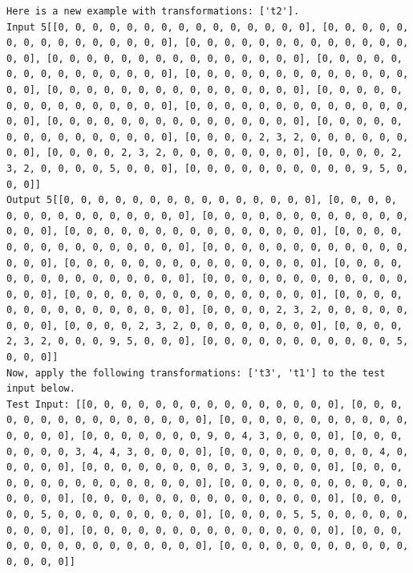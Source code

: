 \begin{lstlisting}
Here is a new example with transformations: ['t2'].
Input 5[[0, 0, 0, 0, 0, 0, 0, 0, 0, 0, 0, 0, 0, 0, 0], [0, 0, 0, 0, 0, 0, 0, 0, 0, 0, 0, 0, 0, 0, 0], [0, 0, 0, 0, 0, 0, 0, 0, 0, 0, 0, 0, 0, 0, 0], [0, 0, 0, 0, 0, 0, 0, 0, 0, 0, 0, 0, 0, 0, 0], [0, 0, 0, 0, 0, 0, 0, 0, 0, 0, 0, 0, 0, 0, 0], [0, 0, 0, 0, 0, 0, 0, 0, 0, 0, 0, 0, 0, 0, 0], [0, 0, 0, 0, 0, 0, 0, 0, 0, 0, 0, 0, 0, 0, 0], [0, 0, 0, 0, 0, 0, 0, 0, 0, 0, 0, 0, 0, 0, 0], [0, 0, 0, 0, 0, 0, 0, 0, 0, 0, 0, 0, 0, 0, 0], [0, 0, 0, 0, 0, 0, 0, 0, 0, 0, 0, 0, 0, 0, 0], [0, 0, 0, 0, 0, 0, 0, 0, 0, 0, 0, 0, 0, 0, 0], [0, 0, 0, 0, 2, 3, 2, 0, 0, 0, 0, 0, 0, 0, 0], [0, 0, 0, 0, 2, 3, 2, 0, 0, 0, 0, 0, 0, 0, 0], [0, 0, 0, 0, 2, 3, 2, 0, 0, 0, 0, 5, 0, 0, 0], [0, 0, 0, 0, 0, 0, 0, 0, 0, 0, 9, 5, 0, 0, 0]]
Output 5[[0, 0, 0, 0, 0, 0, 0, 0, 0, 0, 0, 0, 0, 0, 0], [0, 0, 0, 0, 0, 0, 0, 0, 0, 0, 0, 0, 0, 0, 0], [0, 0, 0, 0, 0, 0, 0, 0, 0, 0, 0, 0, 0, 0, 0], [0, 0, 0, 0, 0, 0, 0, 0, 0, 0, 0, 0, 0, 0, 0], [0, 0, 0, 0, 0, 0, 0, 0, 0, 0, 0, 0, 0, 0, 0], [0, 0, 0, 0, 0, 0, 0, 0, 0, 0, 0, 0, 0, 0, 0], [0, 0, 0, 0, 0, 0, 0, 0, 0, 0, 0, 0, 0, 0, 0], [0, 0, 0, 0, 0, 0, 0, 0, 0, 0, 0, 0, 0, 0, 0], [0, 0, 0, 0, 0, 0, 0, 0, 0, 0, 0, 0, 0, 0, 0], [0, 0, 0, 0, 0, 0, 0, 0, 0, 0, 0, 0, 0, 0, 0], [0, 0, 0, 0, 0, 0, 0, 0, 0, 0, 0, 0, 0, 0, 0], [0, 0, 0, 0, 2, 3, 2, 0, 0, 0, 0, 0, 0, 0, 0], [0, 0, 0, 0, 2, 3, 2, 0, 0, 0, 0, 0, 0, 0, 0], [0, 0, 0, 0, 2, 3, 2, 0, 0, 0, 9, 5, 0, 0, 0], [0, 0, 0, 0, 0, 0, 0, 0, 0, 0, 0, 5, 0, 0, 0]]
Now, apply the following transformations: ['t3', 't1'] to the test input below.
Test Input: [[0, 0, 0, 0, 0, 0, 0, 0, 0, 0, 0, 0, 0, 0, 0], [0, 0, 0, 0, 0, 0, 0, 0, 0, 0, 0, 0, 0, 0, 0], [0, 0, 0, 0, 0, 0, 0, 0, 0, 0, 0, 0, 0, 0, 0], [0, 0, 0, 0, 0, 0, 0, 9, 0, 4, 3, 0, 0, 0, 0], [0, 0, 0, 0, 0, 0, 0, 3, 4, 4, 3, 0, 0, 0, 0], [0, 0, 0, 0, 0, 0, 0, 0, 0, 4, 0, 0, 0, 0, 0], [0, 0, 0, 0, 0, 0, 0, 0, 0, 3, 9, 0, 0, 0, 0], [0, 0, 0, 0, 0, 0, 0, 0, 0, 0, 0, 0, 0, 0, 0], [0, 0, 0, 0, 0, 0, 0, 0, 0, 0, 0, 0, 0, 0, 0], [0, 0, 0, 0, 0, 0, 0, 0, 0, 0, 0, 0, 0, 0, 0], [0, 0, 0, 0, 0, 5, 0, 0, 0, 0, 0, 0, 0, 0, 0], [0, 0, 0, 0, 5, 5, 0, 0, 0, 0, 0, 0, 0, 0, 0], [0, 0, 0, 0, 0, 0, 0, 0, 0, 0, 0, 0, 0, 0, 0], [0, 0, 0, 0, 0, 0, 0, 0, 0, 0, 0, 0, 0, 0, 0], [0, 0, 0, 0, 0, 0, 0, 0, 0, 0, 0, 0, 0, 0, 0]]
\end{lstlisting}